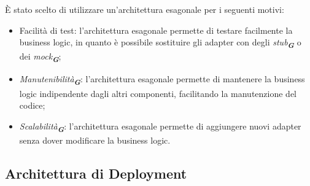 È stato scelto di utilizzare un'architettura esagonale per i seguenti motivi:
\begin{itemize}
    \item Facilità di test: l'architettura esagonale permette di testare facilmente la business logic, in quanto è possibile sostituire gli adapter con degli \emph{stub}\textsubscript{\textbf{\textit{G}}} o dei \emph{mock}\textsubscript{\textbf{\textit{G}}};
    \item \emph{Manutenibilità}\textsubscript{\textbf{\textit{G}}}: l'architettura esagonale permette di mantenere la business logic indipendente dagli altri componenti, facilitando la manutenzione del codice;
    \item \emph{Scalabilità}\textsubscript{\textbf{\textit{G}}}: l'architettura esagonale permette di aggiungere nuovi adapter senza dover modificare la business logic.
\end{itemize}

\subsection{Architettura di Deployment}


